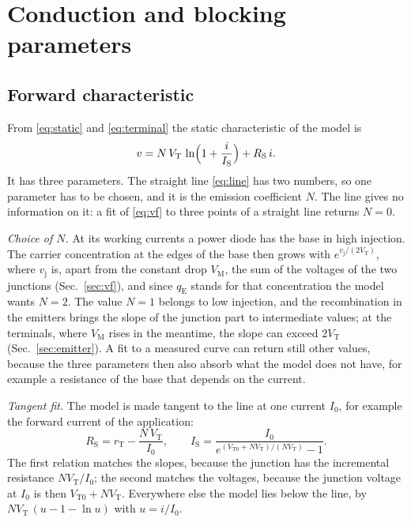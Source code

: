 \documentclass[10pt,a4paper]{scrartcl}
\newcommand{\qE}{q_\mathrm{E}}
\newcommand{\vj}{v_\mathrm{j}}
\newcommand{\IS}{I_\mathrm{S}}
\newcommand{\RS}{R_\mathrm{S}}
\newcommand{\VT}{V_\mathrm{T}}
\newcommand{\VTo}{V_\mathrm{T0}}
\newcommand{\rT}{r_\mathrm{T}}
\newcommand{\Nem}{N}                          %
\newcommand{\VM}{V_\mathrm{M}}
\begin{document}
\section{Conduction and blocking parameters}
\label{sec:static}
\subsection{Forward characteristic}
\label{sec:forward}
From \eqref{eq:static} and \eqref{eq:terminal} the static characteristic of the model is
\begin{equation}
v = \Nem\,\VT\,\ln\Bigl(1 + \frac{i}{\IS}\Bigr) + \RS\, i .
\label{eq:vf}
\end{equation}
It has three parameters. The straight line \eqref{eq:line} has two numbers, so one parameter has to be chosen, and it is the emission coefficient $\Nem$. The line gives no information on it: a fit of \eqref{eq:vf} to three points of a straight line returns $\Nem = 0$.

\emph{Choice of $\Nem$.} At its working currents a power diode has the base in high injection. The carrier concentration at the edges of the base then grows with $e^{\vj/(2\VT)}$, where $\vj$ is, apart from the constant drop $\VM$, the sum of the voltages of the two junctions (Sec.~\ref{sec:vf}), and since $\qE$ stands for that concentration the model wants $\Nem = 2$. The value $\Nem = 1$ belongs to low injection, and the recombination in the emitters brings the slope of the junction part to intermediate values; at the terminals, where $\VM$ rises in the meantime, the slope can exceed $2\VT$ (Sec.~\ref{sec:emitter}). A fit to a measured curve can return still other values, because the three parameters then also absorb what the model does not have, for example a resistance of the base that depends on the current.

\emph{Tangent fit.} The model is made tangent to the line at one current $I_0$, for example the forward current of the application:
\begin{equation}
\RS = \rT - \frac{\Nem\,\VT}{I_0} , \qquad \IS = \frac{I_0}{e^{(\VTo + \Nem\VT)/(\Nem\VT)} - 1} .
\label{eq:tangent}
\end{equation}
The first relation matches the slopes, because the junction has the incremental resistance $\Nem\VT/I_0$; the second matches the voltages, because the junction voltage at $I_0$ is then $\VTo + \Nem\VT$. Everywhere else the model lies below the line, by $\Nem\VT\,(u - 1 - \ln u)$ with $u = i/I_0$.
\end{document}
